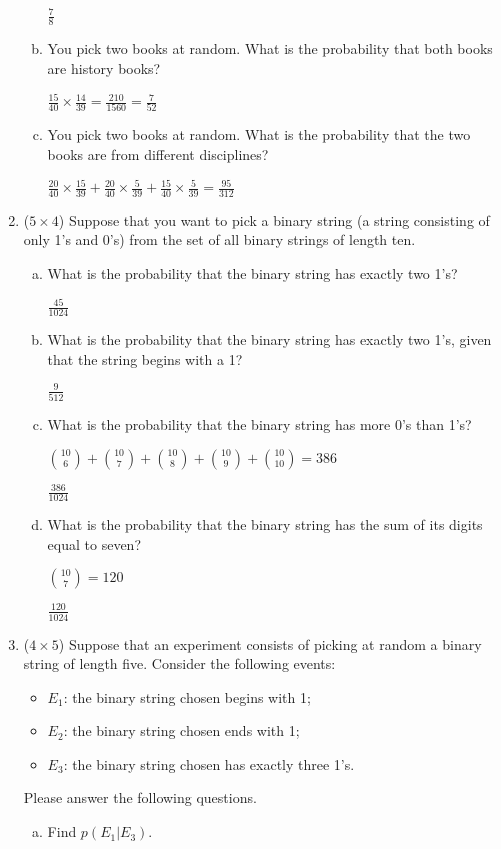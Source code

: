 \documentclass[12pt]{article}
\begin{document}
\begin{enumerate}
\begin{enumerate}[a.]
			$\frac{7}{8}$

			\item You pick two books at random. What is the probability that both books are history books?

			$\frac{15}{40} \times \frac{14}{39} = \frac{210}{1560} = \frac{7}{52}$

			\item You pick two books at random. What is the probability that the two books are from different disciplines?

			$\frac{20}{40} \times \frac{15}{39} + \frac{20}{40} \times \frac{5}{39} + \frac{15}{40} \times \frac{5}{39} = \frac{95}{312}$
		\end{enumerate}

			\newpage
		\item ($5 \times 4$)
		Suppose that you want to pick a binary string (a string consisting of only 1's and 0's) from the set of all binary strings of length ten.
		\begin{enumerate}[a.]
			\item What is the probability that the binary string has exactly two 1's?

			$\frac{45}{1024}$

			\item What is the probability that the binary string has exactly two 1's, given that the string begins with a 1?

			$\frac{9}{512}$

			\item What is the probability that the binary string has more 0's than 1's?

			$ {10 \choose 6} + {10 \choose 7} + {10 \choose 8} + {10 \choose 9} + {10 \choose 10} = 386$

			$\frac{386}{1024}$

			\item What is the probability that the binary string has the sum of its digits equal to seven?

			$ {10 \choose 7} = 120$

			$ \frac{120}{1024}$

		\end{enumerate}

			\newpage
		\item ($4 \times 5$)
		Suppose that an experiment consists of picking at random a binary string of length five. Consider the following events:
		\begin{itemize}
			\item $E_1$: the binary string chosen begins with 1;
			\item $E_2$: the binary string chosen ends with 1;
			\item $E_3$: the binary string chosen has exactly three 1's.
		\end{itemize}
		Please answer the following questions.
		\begin{enumerate}[a.]
			\item Find $p(E_1|E_3)$.


\end{enumerate}
\end{enumerate}
\end{document}
